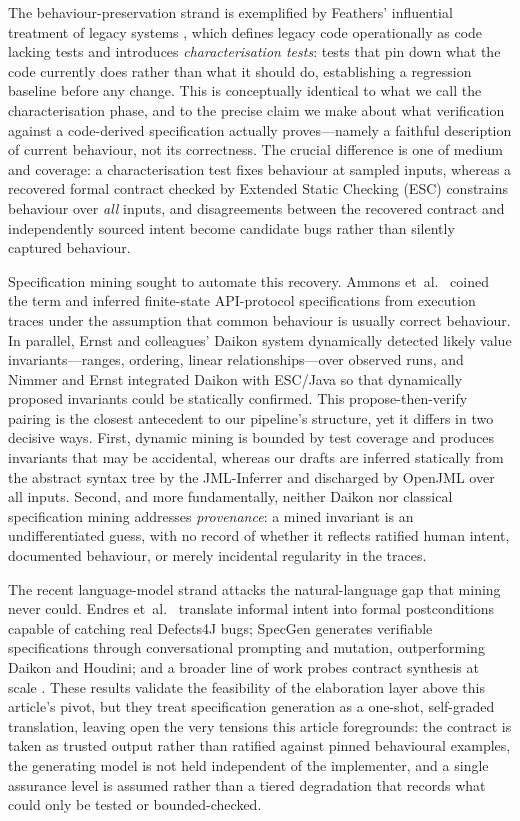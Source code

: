 The behaviour-preservation strand is exemplified by Feathers' influential treatment of legacy systems \cite{feathers2004legacy}, which defines legacy code operationally as code lacking tests and introduces \emph{characterisation tests}: tests that pin down what the code currently does rather than what it should do, establishing a regression baseline before any change. This is conceptually identical to what we call the characterisation phase, and to the precise claim we make about what verification against a code-derived specification actually proves---namely a faithful description of current behaviour, not its correctness. The crucial difference is one of medium and coverage: a characterisation test fixes behaviour at sampled inputs, whereas a recovered formal contract checked by Extended Static Checking (ESC) constrains behaviour over \emph{all} inputs, and disagreements between the recovered contract and independently sourced intent become candidate bugs rather than silently captured behaviour.

Specification mining sought to automate this recovery. Ammons et~al.\ \cite{ammons2002mining} coined the term and inferred finite-state API-protocol specifications from execution traces under the assumption that common behaviour is usually correct behaviour. In parallel, Ernst and colleagues' Daikon system \cite{ernst2007daikon} dynamically detected likely value invariants---ranges, ordering, linear relationships---over observed runs, and Nimmer and Ernst \cite{nimmer2001static} integrated Daikon with ESC/Java so that dynamically proposed invariants could be statically confirmed. This propose-then-verify pairing is the closest antecedent to our pipeline's structure, yet it differs in two decisive ways. First, dynamic mining is bounded by test coverage and produces invariants that may be accidental, whereas our drafts are inferred statically from the abstract syntax tree by the JML-Inferrer and discharged by OpenJML over all inputs. Second, and more fundamentally, neither Daikon nor classical specification mining addresses \emph{provenance}: a mined invariant is an undifferentiated guess, with no record of whether it reflects ratified human intent, documented behaviour, or merely incidental regularity in the traces.

The recent language-model strand attacks the natural-language gap that mining never could. Endres et~al.\ \cite{endres2024nl2postcond} translate informal intent into formal postconditions capable of catching real Defects4J bugs; SpecGen \cite{ma2025specgen} generates verifiable specifications through conversational prompting and mutation, outperforming Daikon and Houdini; and a broader line of work probes contract synthesis at scale \cite{lahiri2025nl2contract}. These results validate the feasibility of the elaboration layer above this article's pivot, but they treat specification generation as a one-shot, self-graded translation, leaving open the very tensions this article foregrounds: the contract is taken as trusted output rather than ratified against pinned behavioural examples, the generating model is not held independent of the implementer, and a single assurance level is assumed rather than a tiered degradation that records what could only be tested or bounded-checked.

